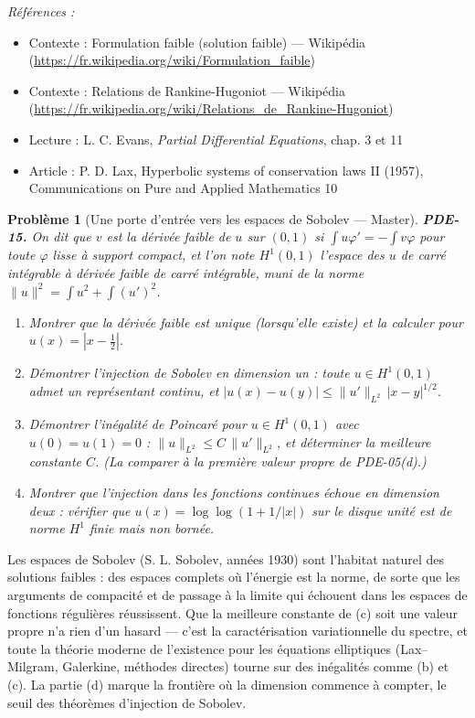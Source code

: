 \documentclass[11pt]{article}
\newtheorem{problem}{Problème}
\newenvironment{refs}{\par\small\noindent\emph{Références :}\begin{itemize}\setlength\itemsep{0pt}}{\end{itemize}\normalsize}
\begin{document}
\begin{refs}
\item Contexte : Formulation faible (solution faible) --- Wikipédia (\url{https://fr.wikipedia.org/wiki/Formulation_faible})
\item Contexte : Relations de Rankine-Hugoniot --- Wikipédia (\url{https://fr.wikipedia.org/wiki/Relations_de_Rankine-Hugoniot})
\item Lecture : L. C. Evans, \textit{Partial Differential Equations}, chap. 3 et 11
\item Article : P. D. Lax, \og{} Hyperbolic systems of conservation laws II \fg{} (1957), Communications on Pure and Applied Mathematics 10
\end{refs}

\bigskip

\begin{problem}[{Une porte d'entrée vers les espaces de Sobolev --- Master}]
\textbf{PDE-15.} On dit que $v$ est la \textit{dérivée faible} de
$u$ sur $(0,1)$ si $\int u\varphi' = -\int v\varphi$ pour toute $\varphi$ lisse à
support compact, et l'on note $H^1(0,1)$ l'espace des $u$ de carré intégrable
à dérivée faible de carré intégrable, muni de la norme
$\|u\|^2 = \int u^2 + \int (u')^2$.
\begin{enumerate}
\item[(a)] Montrer que la dérivée faible est unique (lorsqu'elle
existe) et la calculer pour $u(x) = |x - \tfrac12|$.
\item[(b)] Démontrer l'injection
de Sobolev en dimension un : toute $u \in H^1(0,1)$ admet un représentant
continu, et $|u(x) - u(y)| \le \|u'\|_{L^2}\,|x-y|^{1/2}$.
\item[(c)] Démontrer
l'inégalité de Poincaré pour $u \in H^1(0,1)$ avec $u(0) = u(1) = 0$ :
$\|u\|_{L^2} \le C\,\|u'\|_{L^2}$, et déterminer la meilleure constante $C$.
(La comparer à la première valeur propre de PDE-05(d).)
\item[(d)] Montrer que l'injection dans les
fonctions continues échoue en dimension deux : vérifier que
$u(x) = \log\log(1 + 1/|x|)$ sur le disque unité est de norme $H^1$ finie mais
non bornée.
\end{enumerate}

\end{problem}

\noindent Les espaces de Sobolev (S. L. Sobolev, années 1930) sont l'habitat naturel des
solutions faibles : des espaces complets où \og{} l'énergie \fg{} est la norme, de sorte que les arguments
de compacité et de passage à la limite qui échouent dans les espaces de fonctions régulières
réussissent. Que la meilleure constante de (c) soit une valeur propre n'a rien d'un hasard --- c'est
la caractérisation variationnelle du spectre, et toute la théorie moderne de l'existence pour les
équations elliptiques (Lax--Milgram, Galerkine, méthodes directes) tourne sur des inégalités comme
(b) et (c). La partie (d) marque la frontière où la dimension commence à compter, le seuil des
théorèmes d'injection de Sobolev.
\end{document}

